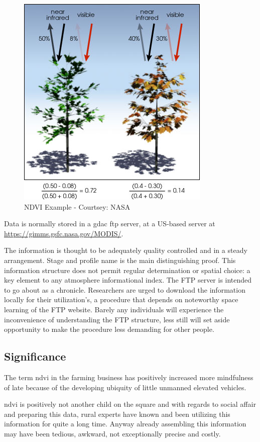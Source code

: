     \begin{figure}[H]
            \centering
            \includegraphics[width=0.5\linewidth]{figures/ch3/ndvi-example.png}
            \caption{\label{fig:ndvi_example} NDVI Example - Courtsey: NASA}
    \end{figure}

Data is normally stored in a \gls{gdac} \gls{ftp} server, at a US-based server at \url{https://gimms.gsfc.nasa.gov/MODIS/}.

The information is thought to be adequately quality controlled and in a steady arrangement. Stage and profile name is the main distinguishing proof. This information structure does not permit regular determination or spatial choice: a key element to any atmosphere informational index. The FTP server is intended to go about as a chronicle. Researchers are urged to download the information locally for their utilization's, a procedure that depends on noteworthy space learning of the FTP website. Barely any individuals will experience the inconvenience of understanding the FTP structure, less still will set aside opportunity to make the procedure less demanding for other people.

\subsection{Significance}

The term \gls{ndvi} in the farming business has positively increased more mindfulness of late because of the developing ubiquity of little unmanned elevated vehicles. 

\gls{ndvi} is positively not another child on the square and with regards to social affair and preparing this data, rural experts have known and been utilizing this information for quite a long time. Anyway already assembling this information may have been tedious, awkward, not exceptionally precise and costly. 

